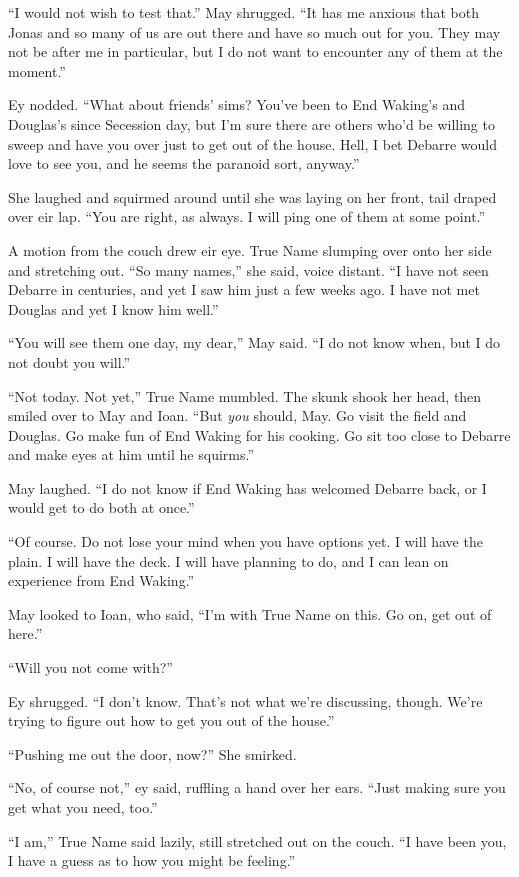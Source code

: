 ``I would not wish to test that.'' May shrugged. ``It has me anxious that both Jonas and so many of us are out there and have so much out for you. They may not be after me in particular, but I do not want to encounter any of them at the moment.''

Ey nodded. ``What about friends' sims? You've been to End Waking's and Douglas's since Secession day, but I'm sure there are others who'd be willing to sweep and have you over just to get out of the house. Hell, I bet Debarre would love to see you, and he seems the paranoid sort, anyway.''

She laughed and squirmed around until she was laying on her front, tail draped over eir lap. ``You are right, as always. I will ping one of them at some point.''

A motion from the couch drew eir eye. True Name slumping over onto her side and stretching out. ``So many names,'' she said, voice distant. ``I have not seen Debarre in centuries, and yet I saw him just a few weeks ago. I have not met Douglas and yet I know him well.''

``You will see them one day, my dear,'' May said. ``I do not know when, but I do not doubt you will.''

``Not today. Not yet,'' True Name mumbled. The skunk shook her head, then smiled over to May and Ioan. ``But \emph{you} should, May. Go visit the field and Douglas. Go make fun of End Waking for his cooking. Go sit too close to Debarre and make eyes at him until he squirms.''

May laughed. ``I do not know if End Waking has welcomed Debarre back, or I would get to do both at once.''

``Of course. Do not lose your mind when you have options yet. I will have the plain. I will have the deck. I will have planning to do, and I can lean on experience from End Waking.''

May looked to Ioan, who said, ``I'm with True Name on this. Go on, get out of here.''

``Will you not come with?''

Ey shrugged. ``I don't know. That's not what we're discussing, though. We're trying to figure out how to get you out of the house.''

``Pushing me out the door, now?'' She smirked.

``No, of course not,'' ey said, ruffling a hand over her ears. ``Just making sure you get what you need, too.''

``I am,'' True Name said lazily, still stretched out on the couch. ``I have been you, I have a guess as to how you might be feeling.''

